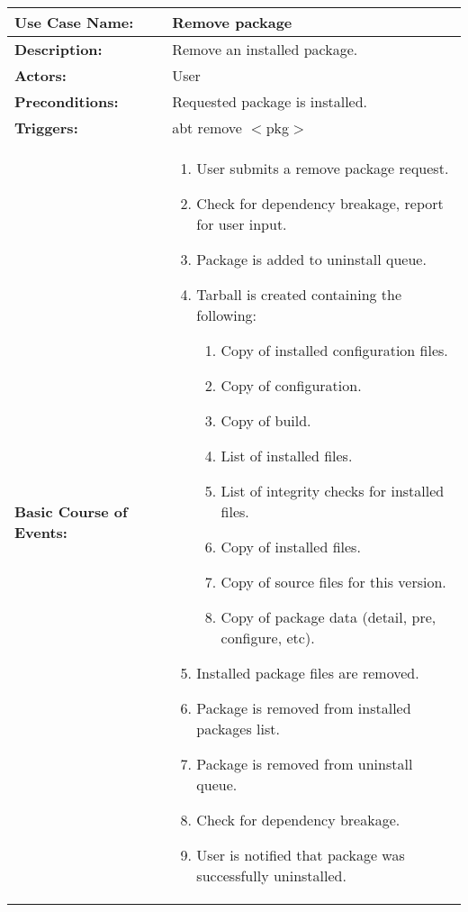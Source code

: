 
\begin{tabularx}{\linewidth}{|l|X|}
\hline
\textbf{Use Case Name:} & \textbf{Remove package} \\
\hline
\textbf{Description:} & 
Remove an installed package. \\
\hline
\textbf{Actors:} & User \\
\hline
\textbf{Preconditions:} & 
Requested package is installed. \\
\hline
\textbf{Triggers:} & abt remove $<$pkg$>$ \\
\hline
\textbf{Basic Course of Events:} & 
\begin{minipage}{\linewidth} 
  \vspace{0.05em}
  \begin{enumerate}
    \item User submits a remove package request.
    \item Check for dependency breakage, report for user input.
    \item Package is added to uninstall queue.
    \item Tarball is created containing the following:
    \begin{enumerate}
      \item Copy of installed configuration files.
      \item Copy of configuration.
      \item Copy of build.
      \item List of installed files.
      \item List of integrity checks for installed files.
      \item Copy of installed files.
      \item Copy of source files for this version.
      \item Copy of package data (detail, pre, configure, etc).
    \end{enumerate}
    \item Installed package files are removed.
    \item Package is removed from installed packages list.
    \item Package is removed from uninstall queue.
    \item Check for dependency breakage.
    \item User is notified that package was successfully uninstalled.
  \end{enumerate}
  \vspace{0.05em}
\end{minipage}

\end{tabularx}
